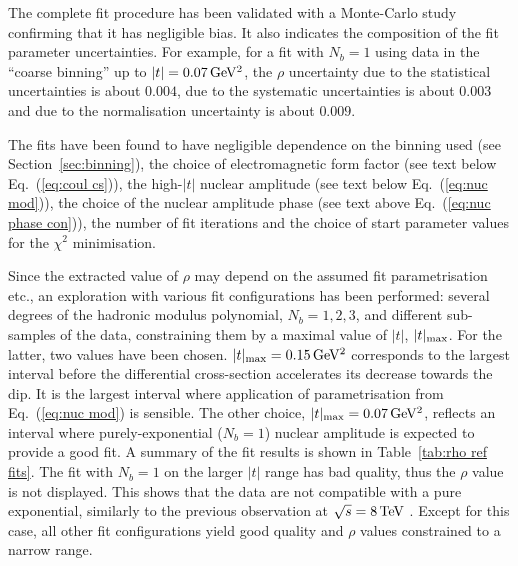 The complete fit procedure has been validated with a Monte-Carlo study confirming that it has negligible bias. It also indicates the composition of the fit parameter uncertainties. For example, for a fit with $N_b = 1$ using data in the ``coarse binning'' up to $|t| = 0.07\,{\rm GeV^2}$, the $\rho$ uncertainty due to the statistical uncertainties is about $0.004$, due to the systematic uncertainties is about $0.003$ and due to the normalisation uncertainty is about $0.009$.

The fits have been found to have negligible dependence on the binning used (see Section~\ref{sec:binning}), the choice of electromagnetic form factor (see text below Eq.~(\ref{eq:coul cs})), the high-$|t|$ nuclear amplitude (see text below Eq.~(\ref{eq:nuc mod})), the choice of the nuclear amplitude phase (see text above Eq.~(\ref{eq:nuc phase con})), the number of fit iterations and the choice of start parameter values for the $\chi^2$ minimisation.

Since the extracted value of $\rho$ may depend on the assumed fit parametrisation etc., an exploration with various fit configurations has been performed: several degrees of the hadronic modulus polynomial, $N_b = 1, 2, 3$, and different sub-samples of the data, constraining them by a maximal value of $|t|$, $|t|_{\rm max}$. For the latter, two values have been chosen. $|t|_{\rm max} = 0.15\,{\rm GeV^2}$ corresponds to the largest interval before the differential cross-section accelerates its decrease towards the dip. It is the largest interval where application of parametrisation from Eq.~(\ref{eq:nuc mod}) is sensible. The other choice, $|t|_{\rm max} = 0.07\,{\rm GeV^2}$, reflects an interval where purely-exponential ($N_b = 1$) nuclear amplitude is expected to provide a good fit. A summary of the fit results is shown in Table~\ref{tab:rho ref fits}. The fit with $N_b = 1$ on the larger $|t|$ range has bad quality, thus the $\rho$ value is not displayed. This shows that the data are not compatible with a pure exponential, similarly to the previous observation at $\sqrt s = 8\,{\rm TeV}$ \cite{totem-8tev-90m,totem-8tev-1km}. Except for this case, all other fit configurations yield good quality and $\rho$ values constrained to a narrow range.

